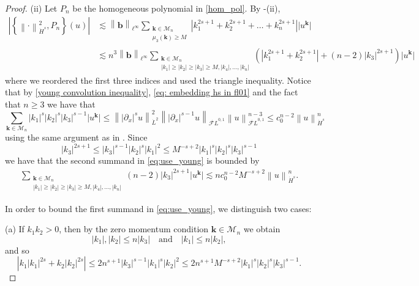 \documentclass[a4paper,10pt,reqno]{article}
\theoremstyle{definition}
\theoremstyle{plain}
\theoremstyle{plain}
\theoremstyle{definition}
\theoremstyle{plain}
\theoremstyle{plain}
\theoremstyle{plain}
\theoremstyle{definition}
\theoremstyle{definition}
\newcommand{\norm}[1]{\left\lVert #1 \right\rVert}
\def \pa{{\partial}}
\def \FL{\mathcal{F}L}
\def \M{\mathcal{M}}
\def \k{\bm{k}}
\begin{document}
\begin{proof}
(ii) Let $P_n$ be the homogeneous polynomial in \eqref{hom_pol}. By -(ii), 
\begin{align}
\left \lvert \left \{ \norm{\cdot}_{\dot{H}^s}^2 , P_n \right \} (u) \right \rvert &\lesssim \norm{\bm{b}}_{\ell^{\infty}} \sum_{ \substack{ \k \in \M_n \\ \mu_3(\k) \ge M } } \left \lvert k_1^{2s+1}+k_2^{2s+1}+\ldots+k_n^{2s+1} \right \rvert \lvert u^{\k} \rvert \nonumber \\
&\lesssim n^3 \norm{\bm{b}}_{\ell^{\infty}} \sum_{ \substack{ \k \in \M_n \\ |k_1| \ge |k_2| \ge |k_3| \ge M,|k_4|,\ldots,|k_n| } } \left ( \left \lvert k_1^{2s+1}+k_2^{2s+1} \right \rvert +(n-2)|k_3|^{2s+1} \right ) \lvert u^{\k} \rvert \label{eq:use_young}
\end{align}
where we reordered the first three indices and used the triangle inequality.
Notice that by \eqref{young convolution inequality}, \eqref{eq: embedding hs in fl01} and the fact that $n \ge 3$ we have that
\begin{equation}\label{eq:young_conseq}
\sum_{\k \in \M_n} |k_1|^s |k_2|^s |k_3|^{s-1} \lvert u^{\k} \rvert \le \norm{|\pa_x|^s u}_{\dot{L}^2}^2 \norm{|\pa_x|^{s-1} u}_{\dot{\FL}^{0,1}} \norm{u}_{\dot{\FL}^{0,1}}^{n-3} \le c_0^{n-2} \norm{u}_{\dot{H}^s}^n
\end{equation}
using the same argument as in .
Since
\[
|k_3|^{2s+1} \le |k_3|^{s-1} |k_2|^s |k_1|^2 \le M^{-s+2} |k_1|^s|k_2|^s|k_3|^{s-1}
\]
we have that the second summand in \eqref{eq:use_young} is bounded by
\[
\begin{split}
\sum_{ \substack{ \k \in \M_n \\ |k_1| \ge |k_2| \ge |k_3| \ge M,|k_4|,\ldots,|k_n| } } (n-2)|k_3|^{2s+1} \lvert u^{\k} \rvert \lesssim n c_0^{n-2} M^{-s+2} \norm{u}_{\dot{H}^s}^n.
\end{split}
\]

In order to bound the first summand in \eqref{eq:use_young}, we distinguish two cases:

\medskip

\noindent (a) If $k_1k_2 > 0$, then by the zero momentum condition $\k \in \M_n$ we obtain
\[
|k_1|,|k_2| \le n|k_3| \quad \text{and} \quad |k_1| \le n|k_2|,
\]
and so
\begin{equation}\label{casea}
\left \lvert k_1|k_1|^{2s} + k_2|k_2|^{2s} \right \rvert \le 2n^{s+1}|k_3|^{s-1}|k_1|^s|k_2|^2 \le 2n^{s+1} M^{-s+2} |k_1|^s|k_2|^s|k_3|^{s-1}.
\end{equation}


\end{proof}
\end{document}
